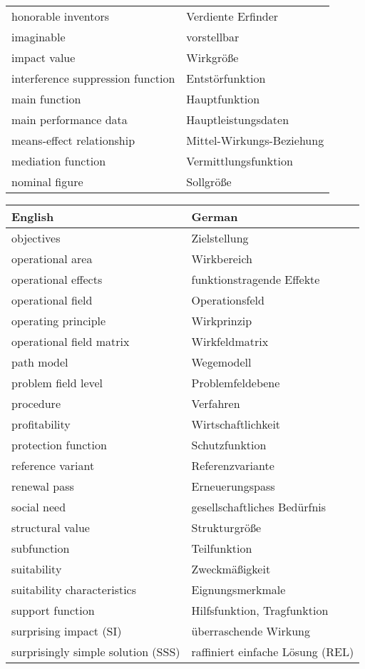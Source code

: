\documentclass[11pt,a4paper]{article}
\begin{document}
\begin{center}
\begin{tabular}{l|l}
    honorable inventors & Verdiente Erfinder\\
    imaginable & vorstellbar \\
    impact value & Wirkgröße \\
    interference suppression function & Entstörfunktion \\
    main function & Hauptfunktion \\
    main performance data & Hauptleistungsdaten \\
    means-effect relationship & Mittel-Wirkungs-Beziehung \\
    mediation function & Vermittlungsfunktion \\
    nominal figure & Sollgröße \\
  \end{tabular}
  \begin{tabular}{l|l}
    English & German \\\hline
    objectives & Zielstellung \\
    operational area & Wirkbereich\\
    operational effects & funktionstragende Effekte\\
    operational field & Operationsfeld \\
    operating principle & Wirkprinzip\\
    operational field matrix & Wirkfeldmatrix\\
    path model & Wegemodell\\
    problem field level & Problemfeldebene \\
    procedure & Verfahren \\
    profitability & Wirtschaftlichkeit \\
    protection function & Schutzfunktion \\
    reference variant & Referenzvariante\\
    renewal pass & Erneuerungspass \\
    social need & gesellschaftliches Bedürfnis\\
    structural value & Strukturgröße\\
    subfunction & Teilfunktion\\
    suitability & Zweckmäßigkeit\\
    suitability characteristics & Eignungsmerkmale\\
    support function & Hilfsfunktion, Tragfunktion \\
    surprising impact (SI) & überraschende Wirkung \\
    surprisingly simple solution (SSS) & raffiniert einfache Lösung (REL)\\

\end{tabular}
\end{center}
\end{document}
